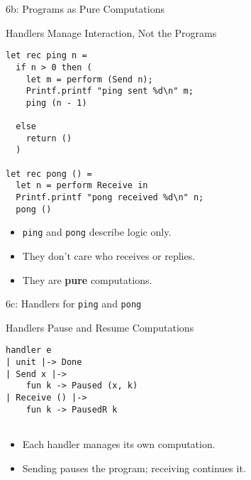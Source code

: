 \begin{frame}[fragile]{6b: Programs as Pure Computations}
\vspace{-0.5em}
\begin{block}{\scriptsize Handlers Manage Interaction, Not the Programs}
\begin{scriptsize}
\begin{verbatim}
let rec ping n =
  if n > 0 then (
    let m = perform (Send n);
    Printf.printf "ping sent %d\n" m;
    ping (n - 1)
    
  else 
    return ()
  )

let rec pong () =
  let n = perform Receive in
  Printf.printf "pong received %d\n" n;
  pong ()
\end{verbatim}
\end{scriptsize}
\end{block}

\begin{itemize}
  \item \texttt{ping} and \texttt{pong} describe logic only.
  \item They don’t care who receives or replies.
  \item They are \textbf{pure} computations.
\end{itemize}
\end{frame}
\begin{frame}[fragile]{6c: Handlers for \texttt{ping} and \texttt{pong}}
\vspace{-0.5em}
\begin{block}{\scriptsize Handlers Pause and Resume Computations}
\begin{scriptsize}
\begin{verbatim}
handler e 
| unit |-> Done
| Send x |-> 
    fun k -> Paused (x, k)
| Receive () |->
    fun k -> PausedR k
        
\end{verbatim}
\end{scriptsize}
\end{block}

\begin{itemize}
  \item Each handler manages its own computation.
  \item Sending pauses the program; receiving continues it.
\end{itemize}
\end{frame}
